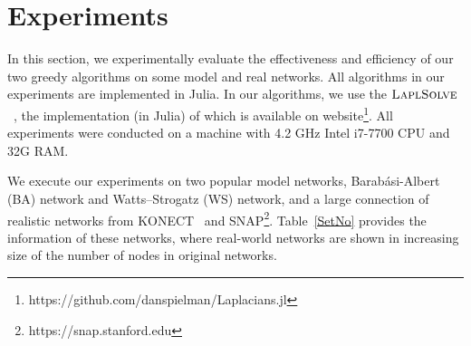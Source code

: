 \documentclass{article}
\def\kh#1{\left( #1 \right)}
\newcommand{\eps}{\epsilon}
\newcommand{\LaplSolver}{\textsc{LaplSolve}}
\begin{document}

\section{Experiments}

In this section, we experimentally evaluate the effectiveness and efficiency of our two greedy algorithms on some model and real  networks. All algorithms in our experiments are implemented in Julia. In our algorithms, we use the  $\LaplSolver$~\cite{kyng2016approximate}, the  implementation (in Julia) of  which is available on website\footnote{https://github.com/danspielman/Laplacians.jl}. All experiments were conducted on a machine with 4.2 GHz Intel i7-7700 CPU and 32G RAM.

We execute our experiments on two popular model networks, Barab\'asi-Albert (BA) network and Watts–Strogatz (WS) network, and a large connection of realistic networks from KONECT~\cite{kunegis2013konect} and SNAP\footnote{https://snap.stanford.edu}. Table~\ref{SetNo} provides the information of these networks, where real-world networks are shown in increasing size of the  number of nodes in original networks.
\end{document}
